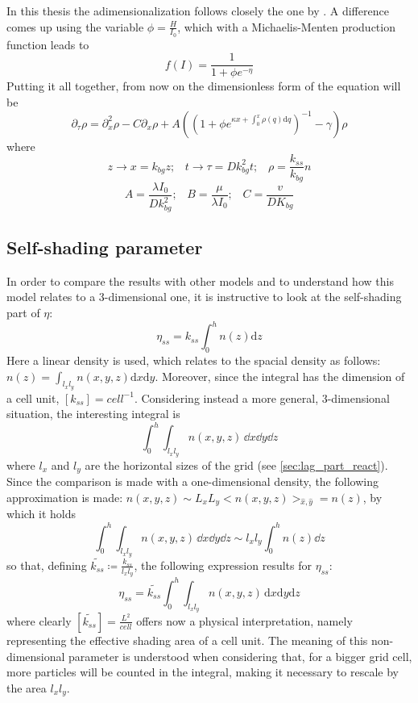 In this thesis the adimensionalization follows closely the one by \autocite{Ebert2001CriticalBlooms}. A difference comes up using the variable \( \phi = \frac{H}{I_0} \), which with a Michaelis-Menten production function leads to
\[ f(I) = \frac{1}{1+\phi e^{-\eta}} \]
Putting it all together, from now on the dimensionless form of the equation will be
\[  
\partial_\tau \rho = \partial_x^2 \rho - C \partial_x \rho + A \left(
\left( 1 +\phi e^{\kappa x + \int_0^x \rho(q) \mathrm{d}q} \right)^{-1}
 - \gamma\right) \rho
\]
where
\[ z \rightarrow x= k_{bg} z ; \;\;\; t \rightarrow \tau = D k_{bg}^2 t ; \;\;\; \rho = \frac{k_{ss}}{k_{bg}}n \]
\[A = \frac{\lambda I_0}{Dk_{bg}^2} ;\;\;\; B = \frac{\mu}{\lambda I_0} ; \;\;\; C=\frac{v}{D K_{bg}} \]

\subsection{Self-shading parameter}
In order to compare the results with other models and to understand how this model relates to a 3-dimensional one, it is instructive to look at the self-shading part of $\eta$:
\[ \eta_{ss} = k_{ss} \int_0^h n(z) \mathrm{d}z \]
Here a linear density is used, which relates to the spacial density as follows: \( n(z) = \int_{l_x l_y} n(x,y,z) \mathrm{d}x \mathrm{d}y \). Moreover, since the integral has the dimension of a cell unit, \( [k_{ss}] = cell^{-1} \). Considering instead a more general, 3-dimensional situation,
the interesting integral is 
\[\int_0^h \int_{l_x l_y} n(x,y,z) \,\dd x \dd y \dd z\]
where $l_x$ and $l_y$ are the horizontal sizes of the grid (see \autoref{sec:lag_part_react}). Since the comparison is made with a one-dimensional density, the following approximation is made: \( n(x,y,z) \sim L_x L_y <n(x,y,z)>_{\hat{x},\hat{y}} = n(z) \), by which it holds
\[\int_0^h \int_{l_x l_y} n(x,y,z) \,\dd x \dd y \dd z \sim l_x l_y \int_0^h n(z) \dd z \]
so that, defining \( \tilde{k_{ss}} \coloneqq \frac{k_{ss}}{l_x l_y} \), the following expression results for $\eta_{ss}$:
\[ \eta_{ss} = \tilde{k_{ss}} \int_0^h \int_{l_x l_y} n(x,y,z)\, \mathrm{d}x \mathrm{d}y\mathrm{d}z \]
where clearly \( [\tilde{k_{ss}}] = \frac{L^2}{cell} \) offers now a physical interpretation, namely representing the effective shading area of a cell unit. The meaning of this non-dimensional parameter is understood when considering that, for a bigger grid cell, more particles will be counted in the integral, making it necessary to rescale by the area $l_xl_y$.